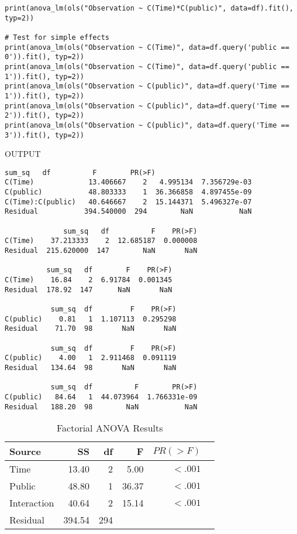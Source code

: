 \documentclass[onecolumn,10pt]{jhwhw}
\begin{document}
\begin{lstlisting}
print(anova_lm(ols("Observation ~ C(Time)*C(public)", data=df).fit(), typ=2))

# Test for simple effects
print(anova_lm(ols("Observation ~ C(Time)", data=df.query('public == 0')).fit(), typ=2))
print(anova_lm(ols("Observation ~ C(Time)", data=df.query('public == 1')).fit(), typ=2))
print(anova_lm(ols("Observation ~ C(public)", data=df.query('Time == 1')).fit(), typ=2))
print(anova_lm(ols("Observation ~ C(public)", data=df.query('Time == 2')).fit(), typ=2))
print(anova_lm(ols("Observation ~ C(public)", data=df.query('Time == 3')).fit(), typ=2))
\end{lstlisting}
\noindent OUTPUT
\begin{lstlisting}[language={}]
                       sum_sq   df          F        PR(>F)
C(Time)             13.406667    2   4.995134  7.356729e-03
C(public)           48.803333    1  36.366858  4.897455e-09
C(Time):C(public)   40.646667    2  15.144371  5.496327e-07
Residual           394.540000  294        NaN           NaN

              sum_sq   df          F    PR(>F)
C(Time)    37.213333    2  12.685187  0.000008
Residual  215.620000  147        NaN       NaN

          sum_sq   df        F    PR(>F)
C(Time)    16.84    2  6.91784  0.001345
Residual  178.92  147      NaN       NaN

           sum_sq  df         F    PR(>F)
C(public)    0.81   1  1.107113  0.295298
Residual    71.70  98       NaN       NaN

           sum_sq  df         F    PR(>F)
C(public)    4.00   1  2.911468  0.091119
Residual   134.64  98       NaN       NaN

           sum_sq  df          F        PR(>F)
C(public)   84.64   1  44.073964  1.766331e-09
Residual   188.20  98        NaN           NaN
\end{lstlisting}

\begin{table}[h!]
\begin{center}
\begin{tabular}{l r r r r r}
\toprule
Source & SS & df & F & $PR(>F)$ \\
\midrule
Time         &   13.40 &   2 &  5.00 & $<.001$ \\
Public       &   48.80 &   1 & 36.37 & $<.001$ \\
Interaction  &   40.64 &   2 & 15.14 & $<.001$ \\
Residual     &  394.54 & 294 &       &         \\
\bottomrule
\end{tabular}
\end{center}
\caption{Factorial ANOVA Results}
\end{table}
\end{document}
